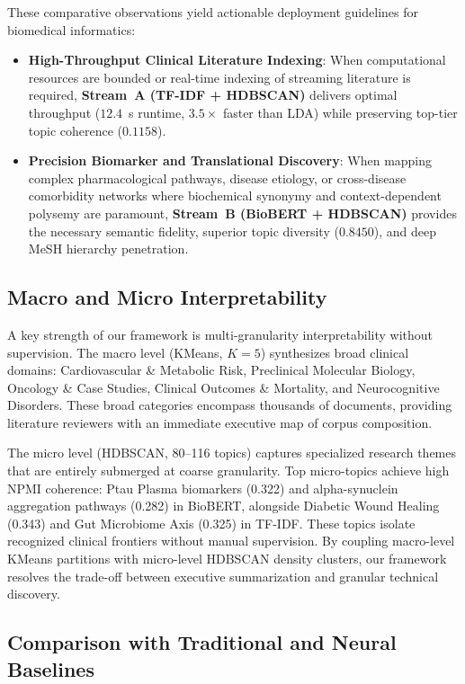 \documentclass[a4paper,fleqn]{cas-dc}
\begin{document}
These comparative observations yield actionable deployment guidelines for biomedical informatics:
\begin{itemize}
\item \textbf{High-Throughput Clinical Literature Indexing}: When computational resources are bounded or real-time indexing of streaming literature is required, \textbf{Stream~A (TF-IDF + HDBSCAN)} delivers optimal throughput ($12.4$~s runtime, $3.5\times$ faster than LDA) while preserving top-tier topic coherence ($0.1158$).
\item \textbf{Precision Biomarker and Translational Discovery}: When mapping complex pharmacological pathways, disease etiology, or cross-disease comorbidity networks where biochemical synonymy and context-dependent polysemy are paramount, \textbf{Stream~B (BioBERT + HDBSCAN)} provides the necessary semantic fidelity, superior topic diversity ($0.8450$), and deep MeSH hierarchy penetration.
\end{itemize}

\subsection{Macro and Micro Interpretability}

A key strength of our framework is multi-granularity interpretability without supervision. The macro level (KMeans, $K=5$) synthesizes broad clinical domains: Cardiovascular \& Metabolic Risk, Preclinical Molecular Biology, Oncology \& Case Studies, Clinical Outcomes \& Mortality, and Neurocognitive Disorders. These broad categories encompass thousands of documents, providing literature reviewers with an immediate executive map of corpus composition.

The micro level (HDBSCAN, 80--116 topics) captures specialized research themes that are entirely submerged at coarse granularity. Top micro-topics achieve high NPMI coherence: Ptau Plasma biomarkers (0.322) and alpha-synuclein aggregation pathways (0.282) in BioBERT, alongside Diabetic Wound Healing (0.343) and Gut Microbiome Axis (0.325) in TF-IDF. These topics isolate recognized clinical frontiers without manual supervision. By coupling macro-level KMeans partitions with micro-level HDBSCAN density clusters, our framework resolves the trade-off between executive summarization and granular technical discovery.

\subsection{Comparison with Traditional and Neural Baselines}
\end{document}
